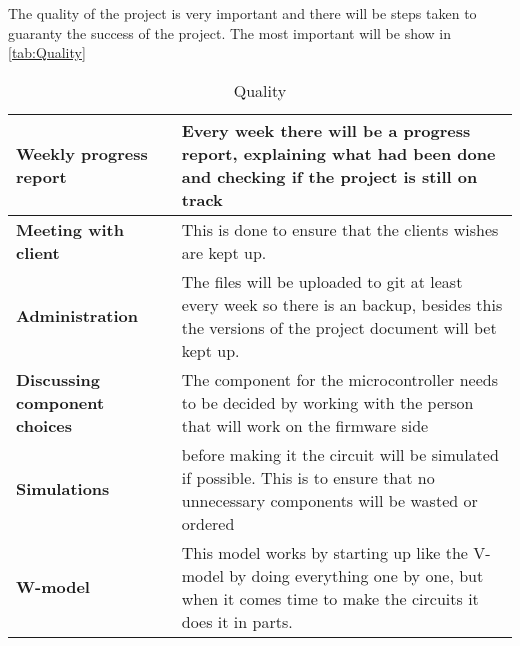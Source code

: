 The quality of the project is very important and there will be steps taken to guaranty the success of the project. The most important will be show in \autoref{tab:Quality}

\begin{table}[H]
    \centering
    \begin{tabular}{l|p{8cm}}
        \bf Weekly progress report & Every week there will be a progress report, explaining what had been done and checking if the project is still on track \\\hline
        \bf Meeting with client & This is done to ensure that the clients wishes are kept up.\\\hline
        \bf  Administration & The files will be uploaded to git at least every week so there is an backup, besides this the versions of the project document will bet kept up. \\\hline
        \bf Discussing component choices & The component for the microcontroller needs to be decided by working with the person that will work on the firmware side \\\hline
        \bf Simulations & before making it the circuit will be simulated if possible. This is to ensure that no unnecessary components will be wasted or ordered \\\hline
        \bf W-model & This model works by starting up like the V-model by doing everything one by one, but when it comes time to make the circuits it does it in parts.\\
    \end{tabular}
    \caption{Quality}
    \label{tab:Quality}
\end{table}